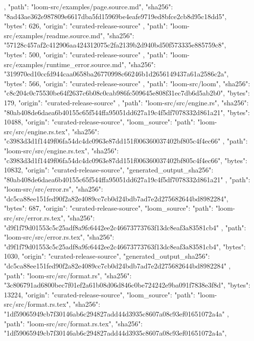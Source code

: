 {{    },
    {
      "path": "loom-src/examples/page.source.md",
      "sha256": "8ad43ae362e987809e6617dba5fd15969be4eafe9719ed8bfce2cb8d95c18dd5",
      "bytes": 626,
      "origin": "curated-release-source"
    },
    {
      "path": "loom-src/examples/readme.source.md",
      "sha256": "57128c457af2c412906aa424312075c2fa2139b2d940bd50f573335e885759c8",
      "bytes": 500,
      "origin": "curated-release-source"
    },
    {
      "path": "loom-src/examples/runtime_error.source.md",
      "sha256": "319970ed10ccfd944caa0658ba26770998c66246b1d2656149437a61a2586c2a",
      "bytes": 566,
      "origin": "curated-release-source"
    },
    {
      "path": "loom-src/loom",
      "sha256": "c8c204c0c75530be64f2637c6b08c0cab986fc509645e808f31ec7db6d5ab2b0",
      "bytes": 179,
      "origin": "curated-release-source"
    },
    {
      "path": "loom-src/src/engine.rs",
      "sha256": "80ab408de6daea6b40155c65f544ffa95051dd627a19c4f5df7078332d861a21",
      "bytes": 10488,
      "origin": "curated-release-source",
      "loom_source": {
        "path": "loom-src/src/engine.rs.tex",
        "sha256": "c3983d3d1f1449f06fa54dc4dc0963e87dd151f006360037402bf805c4f4ec66"
      }
    },
    {
      "path": "loom-src/src/engine.rs.tex",
      "sha256": "c3983d3d1f1449f06fa54dc4dc0963e87dd151f006360037402bf805c4f4ec66",
      "bytes": 10832,
      "origin": "curated-release-source",
      "generated_output_sha256": "80ab408de6daea6b40155c65f544ffa95051dd627a19c4f5df7078332d861a21"
    },
    {
      "path": "loom-src/src/error.rs",
      "sha256": "dc5ca88ee151fed90f2a82e4089cc7cb0d24bdb7ad7e2d275682644bd8982284",
      "bytes": 687,
      "origin": "curated-release-source",
      "loom_source": {
        "path": "loom-src/src/error.rs.tex",
        "sha256": "d9f1f79d01553c5c25adf8a9fc6442ee2c46673773763f13dc8eaf3a83581cb4"
      }
    },
    {
      "path": "loom-src/src/error.rs.tex",
      "sha256": "d9f1f79d01553c5c25adf8a9fc6442ee2c46673773763f13dc8eaf3a83581cb4",
      "bytes": 1030,
      "origin": "curated-release-source",
      "generated_output_sha256": "dc5ca88ee151fed90f2a82e4089cc7cb0d24bdb7ad7e2d275682644bd8982284"
    },
    {
      "path": "loom-src/src/format.rs",
      "sha256": "3c806791ad6800bec7f01ef2a61b08d06d846c0be724242e9ba091f7838e3f8d",
      "bytes": 13224,
      "origin": "curated-release-source",
      "loom_source": {
        "path": "loom-src/src/format.rs.tex",
        "sha256": "1df59065949cb7f30146ab6c294827add44d3935c8607a08c93ef01651072a4a"
      }
    },
    {
      "path": "loom-src/src/format.rs.tex",
      "sha256": "1df59065949cb7f30146ab6c294827add44d3935c8607a08c93ef01651072a4a",
}}
